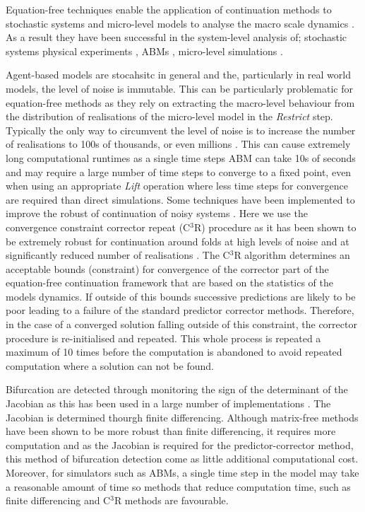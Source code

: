 \documentclass[11pt]{article}
\begin{document}
Equation-free techniques enable the application of continuation methods to stochastic systems and micro-level models to analyse the macro scale dynamics \cite{Kevrekidis2009}. As a result they have been successful in the system-level analysis of; stochastic systems \cite{Barkley2006} physical experiments \cite{Sieber2008,oscillations}, ABMs \cite{Avitabile2014, Thomas2016limno}, micro-level simulations \cite{Frederix2007,Frederix2009}. 

Agent-based models are stocahsitc in general and the, particularly in real world models, the level of noise is immutable. This can be particularly problematic for equation-free methods as they rely on extracting the macro-level behaviour from the distribution of realisations of the micro-level model in the {\em Restrict} step. Typically the only way to circumvent the level of noise is to increase the number of realisations to 100s of thousands, or even millions \cite{Barkley2006}. This can cause extremely long computational runtimes as a single time steps ABM can take 10s of seconds and may require a large number of time steps to converge to a fixed point, even when using an appropriate {\em Lift} operation where less time steps for convergence are required than direct simulations. Some techniques have been implemented to improve the robust of continuation of noisy systems \cite{}. Here we use the convergence constraint corrector repeat (C$^3$R) procedure as it has been shown to be extremely robust for continuation around folds at high levels of noise and at significantly reduced number of realisations \cite{Thomas2016ember}. The C$^3$R algorithm determines an acceptable bounds (constraint) for convergence of the corrector part of the equation-free continuation framework that are based on the statistics of the models dynamics. If outside of this bounds successive predictions are likely to be poor leading to a failure of the standard predictor corrector methods. Therefore, in the case of a converged solution falling outside of this constraint, the corrector procedure is re-initialised and repeated. This whole process is repeated a maximum of 10 times before the computation is abandoned to avoid repeated computation where a solution can not be found.

Bifurcation are detected through monitoring the sign of the determinant of the Jacobian as this has been used in a large number of implementations \cite{}. The Jacobian is determined thourgh finite differencing. Although matrix-free methods have been shown to be more robust than finite differencing, it requires more computation and as the Jacobian is required for the predictor-corrector method, this method of bifurcation detection come as little additional computational cost. Moreover, for simulators such as ABMs, a single time step in the model may take a reasonable amount of time so methods that reduce computation time, such as finite differencing and C$^3$R methods are favourable.
\end{document}

